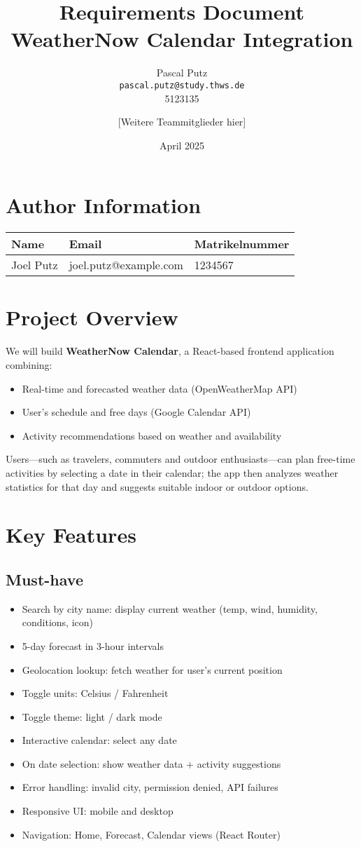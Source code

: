 \documentclass[11pt,a4paper]{article}
\title{Requirements Document\\\large WeatherNow Calendar Integration}
\author{
  Pascal Putz \\ \texttt{pascal.putz@study.thws.de} \\ 5123135
  \and
  [Weitere Teammitglieder hier]
}
\date{April 2025}
\begin{document}
\maketitle

\section{Author Information}
\begin{longtable}{|p{5cm}|p{6cm}|p{3cm}|}
\hline
\textbf{Name} & \textbf{Email} & \textbf{Matrikelnummer} \\
\hline
Joel Putz & joel.putz@example.com & 1234567 \\
\hline
\end{longtable}

\section{Project Overview}
We will build \textbf{WeatherNow Calendar}, a React-based frontend application combining:
\begin{itemize}[nosep]
  \item Real-time and forecasted weather data (OpenWeatherMap API)
  \item User’s schedule and free days (Google Calendar API)
  \item Activity recommendations based on weather and availability
\end{itemize}
Users—such as travelers, commuters and outdoor enthusiasts—can plan free-time activities by selecting a date in their calendar; the app then analyzes weather statistics for that day and suggests suitable indoor or outdoor options.

\section{Key Features}
\subsection*{Must-have}
\begin{itemize}[nosep]
  \item Search by city name: display current weather (temp, wind, humidity, conditions, icon)
  \item 5-day forecast in 3-hour intervals
  \item Geolocation lookup: fetch weather for user’s current position
  \item Toggle units: Celsius / Fahrenheit
  \item Toggle theme: light / dark mode
  \item Interactive calendar: select any date
  \item On date selection: show weather data + activity suggestions
  \item Error handling: invalid city, permission denied, API failures
  \item Responsive UI: mobile and desktop
  \item Navigation: Home, Forecast, Calendar views (React Router)
\end{itemize}
\end{document}
